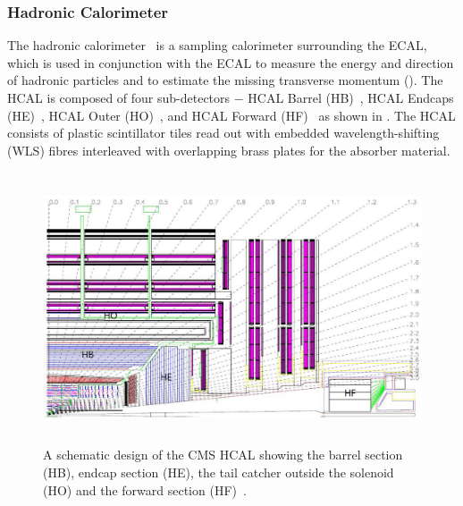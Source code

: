 \subsubsection{Hadronic Calorimeter}
The hadronic calorimeter~\cite{Chatrchyan:2008aa,hcalTDR} is a sampling calorimeter surrounding the ECAL, which is used in conjunction with 
the ECAL to measure the energy and direction of hadronic particles and to estimate the missing transverse momentum (\met).
The HCAL is composed of four sub-detectors $-$ HCAL Barrel (\gls{HB})~\cite{Abdullin:2008zzb}, HCAL Endcaps (\gls{HE})~\cite{Baiatian:2008zz}, 
HCAL Outer (\gls{HO})~\cite{Abdullin:2008zza}, and HCAL Forward (\gls{HF})~\cite{Bayatian:2006jz} as shown in \fig{\ref{fig:cmsHCAL}}. 
The HCAL consists of plastic scintillator tiles read out with embedded wavelength-shifting (\gls{WLS}) fibres interleaved with overlapping brass plates 
for the absorber material.
\begin{figure}[h!]
 \centering
 \includegraphics[width=13cm,height=8cm]{ch2/figures/cmsHCAL.png}
 \caption{A schematic design of the CMS HCAL showing the barrel section (HB), endcap section (HE), the tail catcher outside the solenoid (HO) and the forward section (HF)~\cite{cmsTDR}.}
 \label{fig:cmsHCAL}
\end{figure}

